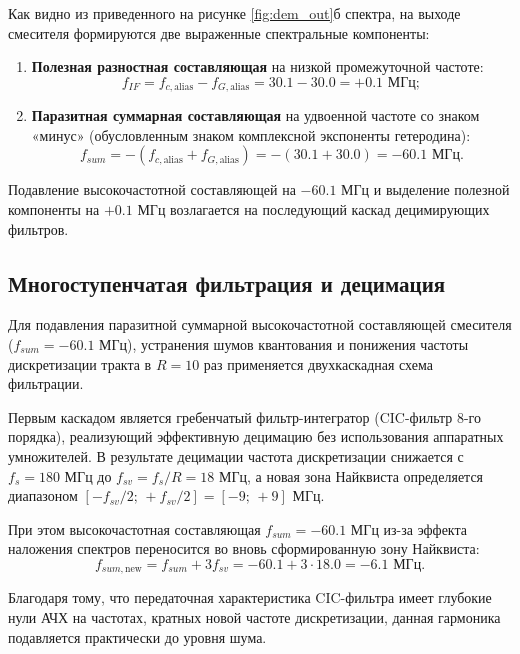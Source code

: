 Как видно из приведенного на рисунке \ref{fig:dem_out}б спектра, на выходе смесителя формируются две выраженные спектральные компоненты:
\begin{enumerate}
    \item \textbf{Полезная разностная составляющая} на низкой промежуточной частоте:
    \begin{equation}
        f_{IF} = f_{c,\text{alias}} - f_{G,\text{alias}} = 30.1 - 30.0 = +0.1\text{ МГц};
    \end{equation}
    \item \textbf{Паразитная суммарная составляющая} на удвоенной частоте со знаком «минус» (обусловленным знаком комплексной экспоненты гетеродина):
    \begin{equation}
        f_{sum} = -(f_{c,\text{alias}} + f_{G,\text{alias}}) = -(30.1 + 30.0) = -60.1\text{ МГц}.
    \end{equation}
\end{enumerate}
Подавление высокочастотной составляющей на $-60.1$ МГц и выделение полезной компоненты на $+0.1$ МГц возлагается на последующий каскад децимирующих фильтров.

\subsection{Многоступенчатая фильтрация и децимация}

Для подавления паразитной суммарной высокочастотной составляющей смесителя ($f_{sum} = -60.1$ МГц), устранения шумов квантования и понижения частоты дискретизации тракта в $R=10$ раз применяется двухкаскадная схема фильтрации.

Первым каскадом является гребенчатый фильтр-интегратор (CIC-фильтр 8-го порядка), реализующий эффективную децимацию без использования аппаратных умножителей. В результате децимации частота дискретизации снижается с $f_s = 180$ МГц до $f_{sv} = f_s / R = 18$ МГц, а новая зона Найквиста определяется диапазоном $[-f_{sv}/2;\, +f_{sv}/2] = [-9;\, +9]$ МГц. 

При этом высокочастотная составляющая $f_{sum} = -60.1$ МГц из-за эффекта наложения спектров переносится во вновь сформированную зону Найквиста:
\begin{equation}
    f_{sum,\text{new}} = f_{sum} + 3 f_{sv} = -60.1 + 3 \cdot 18.0 = -6.1\text{ МГц}.
    \label{eq:cic_alias}
\end{equation}

Благодаря тому, что передаточная характеристика CIC-фильтра имеет глубокие нули АЧХ на частотах, кратных новой частоте дискретизации, данная гармоника подавляется практически до уровня шума. 

